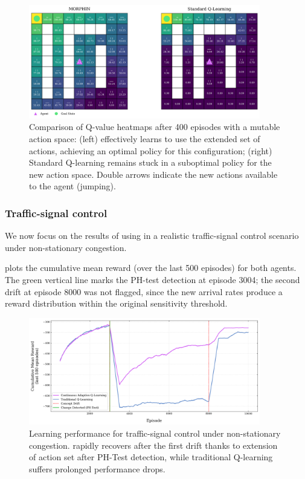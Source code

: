 \begin{figure}[hptb]
    \centering
    \includegraphics[width=0.9\textwidth]{figures/q_map_comp2}
    \caption{Comparison of Q-value heatmaps after 400 episodes with a mutable action space: (left) \adaptiverl effectively learns to use the extended set of actions, achieving an optimal policy for this configuration; (right) Standard Q-learning remains stuck in a suboptimal policy for the new action space. Double arrows indicate the new actions available to the agent (jumping).}
    \label{fig:q-value-comp2}
\end{figure}

\subsubsection{Traffic-signal control}

We now focus on the results of using \adaptiverl in a realistic traffic-signal control scenario under non-stationary congestion.  

 plots the cumulative mean reward (over the last 500 episodes) for both agents. The green vertical line marks the PH-test detection at episode 3004; the second drift at episode 8000 was not flagged, since the new arrival rates produce a reward distribution within the original sensitivity threshold.

\begin{figure}[hptb]
    \centering
    \includegraphics[width=0.9\textwidth]{figures/traffic_learning_curve}
    \caption{Learning performance for traffic-signal control under non-stationary congestion. \adaptiverl rapidly recovers after the first drift thanks to extension of action set after PH-Test detection, while traditional Q-learning suffers prolonged performance drops.}
    \label{fig:traffic-learning-curve}
\end{figure}

